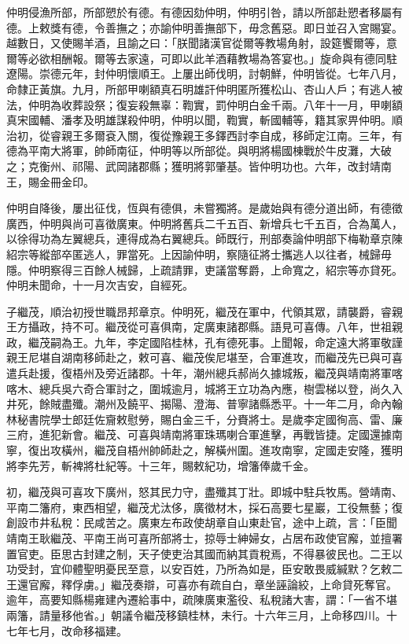 \begin{pinyinscope}
仲明侵漁所部，所部愬於有德。有德因劾仲明，仲明引咎，請以所部赴愬者移屬有德。上敕獎有德，令善撫之；亦諭仲明善撫部下，毋念舊惡。即日並召入宮賜宴。越數日，又使賜羊酒，且諭之曰：「朕聞諸漢官從爾等教場角射，設筵饗爾等，意爾等必欲相酬報。爾等去家遠，可即以此羊酒藉教場為答宴也。」旋命與有德同駐遼陽。崇德元年，封仲明懷順王。上屢出師伐明，討朝鮮，仲明皆從。七年八月，命隸正黃旗。九月，所部甲喇額真石明雄訐仲明匿所獲松山、杏山人戶；有逃人被法，仲明為收葬設祭；復妄殺無辜：鞫實，罰仲明白金千兩。八年十一月，甲喇額真宋國輔、潘孝及明雄謀殺仲明，仲明以聞，鞫實，斬國輔等，籍其家畀仲明。順治初，從睿親王多爾袞入關，復從豫親王多鐸西討李自成，移師定江南。三年，有德為平南大將軍，帥師南征，仲明等以所部從。與明將楊國棟戰於牛皮灘，大破之；克衡州、祁陽、武岡諸郡縣；獲明將郭肇基。皆仲明功也。六年，改封靖南王，賜金冊金印。

仲明自降後，屢出征伐，恆與有德俱，未嘗獨將。是歲始與有德分道出師，有德徵廣西，仲明與尚可喜徵廣東。仲明將舊兵二千五百、新增兵七千五百，合為萬人，以徐得功為左翼總兵，連得成為右翼總兵。師既行，刑部奏論仲明部下梅勒章京陳紹宗等縱部卒匿逃人，罪當死。上因諭仲明，察隨征將士攜逃人以往者，械歸毋隱。仲明察得三百餘人械歸，上疏請罪，吏議當奪爵，上命寬之，紹宗等亦貸死。仲明未聞命，十一月次吉安，自經死。

子繼茂，順治初授世職昂邦章京。仲明死，繼茂在軍中，代領其眾，請襲爵，睿親王方攝政，持不可。繼茂從可喜俱南，定廣東諸郡縣。語見可喜傳。八年，世祖親政，繼茂嗣為王。九年，李定國陷桂林，孔有德死事。上聞報，命定遠大將軍敬謹親王尼堪自湖南移師赴之，敕可喜、繼茂俟尼堪至，合軍進攻，而繼茂先已與可喜遣兵赴援，復梧州及旁近諸郡。十年，潮州總兵郝尚久據城叛，繼茂與靖南將軍喀喀木、總兵吳六奇合軍討之，圍城逾月，城將王立功為內應，樹雲梯以登，尚久入井死，餘賊盡殲。潮州及饒平、揭陽、澄海、普寧諸縣悉平。十一年二月，命內翰林秘書院學士郎廷佐齎敕慰勞，賜白金三千，分賚將士。是歲李定國徇高、雷、廉三府，進犯新會。繼茂、可喜與靖南將軍珠瑪喇合軍進擊，再戰皆捷。定國還據南寧，復出攻橫州，繼茂自梧州帥師赴之，解橫州圍。進攻南寧，定國走安隆，獲明將李先芳，斬裨將杜紀等。十三年，賜敕紀功，增籓俸歲千金。

初，繼茂與可喜攻下廣州，怒其民力守，盡殲其丁壯。即城中駐兵牧馬。營靖南、平南二籓府，東西相望，繼茂尤汰侈，廣徵材木，採石高要七星巖，工役無藝；復創設市井私稅：民咸苦之。廣東左布政使胡章自山東赴官，途中上疏，言：「臣聞靖南王耿繼茂、平南王尚可喜所部將士，掠辱士紳婦女，占居布政使官廨，並擅署置官吏。臣思古封建之制，天子使吏治其國而納其貢稅焉，不得暴彼民也。二王以功受封，宜仰體聖明憂民至意，以安百姓，乃所為如是，臣安敢畏威緘默？乞敕二王還官廨，釋俘虜。」繼茂奏辯，可喜亦有疏自白，章坐誣論絞，上命貸死奪官。逾年，高要知縣楊雍建內遷給事中，疏陳廣東濫役、私稅諸大害，謂：「一省不堪兩籓，請量移他省。」朝議令繼茂移鎮桂林，未行。十六年三月，上命移四川。十七年七月，改命移福建。


\end{pinyinscope}
